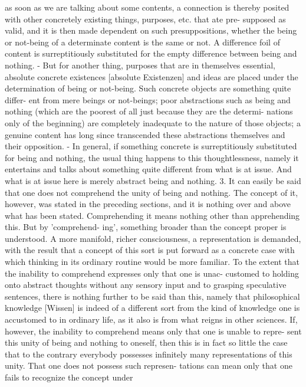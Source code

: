 as soon as we are talking about some contents, a connection is thereby
posited with other concretely existing things, purposes, etc. that ate pre-
supposed as valid, and it is then made dependent on such presuppositions,
whether the being or not-being of a determinate content is the same or
not. A difference foil of content is surreptitiously substituted for the
empty difference between being and nothing. - But for another thing,
purposes that are in themselves essential, absolute concrete existences
[absolute Existenzen] and ideas are placed under the determination of
being or not-being. Such concrete objects are something quite differ-
ent from mere beings or not-beings; poor abstractions such as being and
nothing (which are the poorest of all just because they are the determi-
nations only of the beginning) are completely inadequate to the nature
of those objects; a genuine content has long since transcended these
abstractions themselves and their opposition. - In general, if something
concrete is surreptitiously substituted for being and nothing, the usual
thing happens to this thoughtlessness, namely it entertains and talks
about something quite different from what is at issue. And what is at
issue here is merely abstract being and nothing.
3. It can easily be said that one does not comprehend the unity of being and
nothing. The concept of it, however, was stated in the preceding sections,
and it is nothing over and above what has been stated. Comprehending
it means nothing other than apprehending this. But by 'comprehend-
ing', something broader than the concept proper is understood. A more
manifold, richer consciousness, a representation is demanded, with the
result that a concept of this sort is put forward as a concrete case with
which thinking in its ordinary routine would be more familiar. To the
extent that the inability to comprehend expresses only that one is unac-
customed to holding onto abstract thoughts without any sensory input
and to grasping speculative sentences, there is nothing further to be said
than this, namely that philosophical knowledge [Wissen] is indeed of
a different sort from the kind of knowledge one is accustomed to in
ordinary life, as it also is from what reigns in other sciences. If, however,
the inability to comprehend means only that one is unable to repre-
sent this unity of being and nothing to oneself, then this is in fact so
little the case that to the contrary everybody possesses infinitely many
representations of this unity. That one does not possess such represen-
tations can mean only that one fails to recognize the concept under
